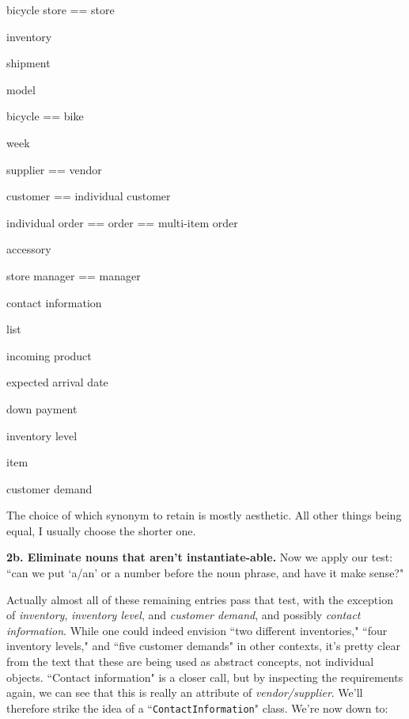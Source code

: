 \begin{samepage}
\begin{multicols}{2}
\small
\begin{compactitem}
\renewcommand\labelitemi{\raisebox{0.25ex}{\small$\bullet$}}
\item bicycle store == store
\item inventory
\item shipment
\item model
\item bicycle == bike
\item week
\item supplier == vendor
\item customer == individual customer
\item individual order == order == multi-item order
\columnbreak
\item accessory
\item store manager == manager
\item contact information
\item list
\item incoming product
\item expected arrival date
\item down payment
\item inventory level
\item item
\item customer demand
\end{compactitem}
\end{multicols}
\end{samepage}

The choice of which synonym to retain is mostly aesthetic. All other things
being equal, I usually choose the shorter one.

\vspace{.1in}
\textbf{2b. Eliminate nouns that aren't instantiate-able.} Now we apply our
test: ``can we put `a/an' or a number before the noun phrase, and have it make
sense?"

Actually almost all of these remaining entries pass that test, with the
exception of \textit{inventory}, \textit{inventory level}, and
\textit{customer demand}, and possibly \textit{contact information}. While one
could indeed envision ``two different inventories," ``four inventory levels,"
and ``five customer demands" in other contexts, it's pretty clear from the
text that these are being used as abstract concepts, not individual objects.
``Contact information" is a closer call, but by inspecting the requirements
again, we can see that this is really an attribute of
\textit{vendor/supplier}. We'll therefore strike the idea of a
``\texttt{ContactInformation}" class. We're now down to:


